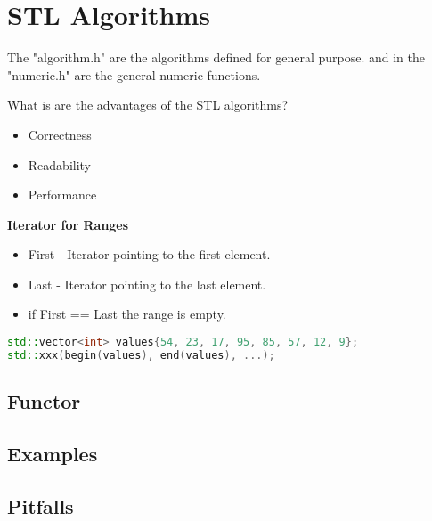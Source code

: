 \section{STL Algorithms}
The "algorithm.h" are the algorithms defined for general purpose. and in the "numeric.h" are the general numeric functions.

What is are the advantages of the STL algorithms?
\begin{itemize}
	\itemsep -0.5em 
	\item Correctness
	\item Readability
	\item Performance
\end{itemize}

\textbf{Iterator for Ranges} \\
\begin{itemize}
  \itemsep 0em 
  \item First - Iterator pointing to the first element.
  \item Last - Iterator pointing to the last element.
  \item if First == Last the range is empty.
\end{itemize}

\begin{lstlisting}[language=C++]
std::vector<int> values{54, 23, 17, 95, 85, 57, 12, 9}; 
std::xxx(begin(values), end(values), ...);
\end{lstlisting}

\subsection{Functor}


\subsection{Examples}

\subsection{Pitfalls}

\pagebreak